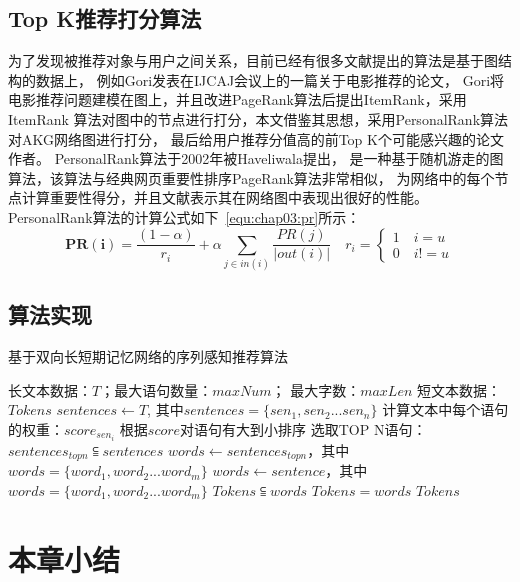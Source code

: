 \subsection{Top K推荐打分算法}
为了发现被推荐对象与用户之间关系，目前已经有很多文献提出的算法是基于图结构的数据上，%
例如Gori发表在IJCAJ会议上的一篇关于电影推荐的论文，%
Gori将电影推荐问题建模在图上，并且改进PageRank算法后提出ItemRank，采用ItemRank%
算法对图中的节点进行打分，本文借鉴其思想，采用PersonalRank算法对AKG网络图进行打分，%
最后给用户推荐分值高的前Top K个可能感兴趣的论文作者。%
PersonalRank算法于2002年被Haveliwala提出，%
是一种基于随机游走的图算法，该算法与经典网页重要性排序PageRank算法非常相似，%
为网络中的每个节点计算重要性得分，并且文献表示其在网络图中表现出很好的性能。%
PersonalRank算法的计算公式如下~\ref{equ:chap03:pr}所示：
\begin{equation}
\label{equ:chap03:pr}
  \mathbf{PR(i)}=\frac{(1-\alpha)}{r_i}+\alpha\sum_{j\in
  in(i)}\frac{PR(j)}{|out(i)|}\quad
   r_i =
  \begin{cases}
   1\quad i=u \\
   0\quad i!=u
  \end{cases}
\end{equation}

\subsection{算法实现}
\begin{algorithm}[htbp]
	\caption{基于双向长短期记忆网络的序列感知推荐算法}
	\label{alg:bi-lstm}
		\begin{algorithmic}[1]
			\REQUIRE 长文本数据：$T$；最大语句数量：$maxNum$； 最大字数：$maxLen$
			\ENSURE 短文本数据：$Tokens$
			\STATE $sentences \leftarrow T$, 其中$sentences=\{sen_{1}, sen_{2}...sen_{n}\}$
			    \STATE 计算文本中每个语句的权重：$score_{sen_{i}}$
			  \ENDFOR
			  \STATE 根据$score$对语句有大到小排序
			  \STATE 选取TOP N语句：$sentences_{topn} \subseteqq sentences$
			  \STATE $words \leftarrow sentences_{topn}$，其中 $words=\{word_{1}, word_{2}...word_{m}\}$
			\ELSE
			  \STATE $words \leftarrow sentence$，其中 $words=\{word_{1}, word_{2}...word_{m}\}$
			\ENDIF
			  \STATE $Tokens \subseteqq words$
			\ELSE
			  \STATE $Tokens = words $
			\ENDIF
			\RETURN $Tokens$
		\end{algorithmic}
\end{algorithm}

\section{本章小结}



